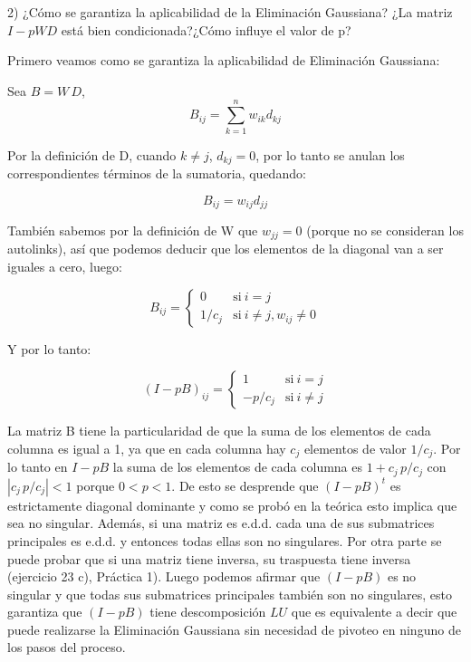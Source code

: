 2) ¿Cómo se garantiza la aplicabilidad de la Eliminación Gaussiana? ¿La matriz $I-pWD$ está bien condicionada?¿Cómo influye el valor de p?

Primero veamos como se garantiza la aplicabilidad de Eliminación Gaussiana:

Sea $B=W\,D$,
\begin{displaymath}
B_{ij}=\sum_{k=1}^n w_{ik}d_{kj}
\end{displaymath}

Por la definición de D, cuando $k\not=j$, $d_{kj}=0$, por lo tanto se anulan los correspondientes términos de la sumatoria, quedando:

\begin{displaymath}
B_{ij}=w_{ij}d_{jj}
\end{displaymath}

También sabemos por la definición de W que $w_{jj}=0$ (porque no se consideran los autolinks), así que podemos deducir que los elementos de la diagonal van a ser iguales a cero, luego:

\begin{equation}
 B_{ij} = \left\{
    \begin{array}{ll}
	 0 & \mathrm{si\ } i=j \\
	 1/c_j & \mathrm{si\ } i\not=j,  w_{ij}\not=0
	 \end{array}
   \right.
\end{equation}

Y por lo tanto:

\begin{equation}
(I-p B)_{ij} = \left\{
    \begin{array}{ll}
	 1 & \mathrm{si\ } i=j \\
	 -p/c_j & \mathrm{si\ } i\not=j
	 \end{array}
   \right.
\end{equation}

La matriz B tiene la particularidad de que la suma de los elementos de cada columna es igual a 1, ya que en cada columna hay $c_j$ elementos de valor $1/c_j$. Por lo tanto en $I-p B$ la suma de los elementos de cada columna es $1+c_j\, p/c_j$ con $|c_j\, p/c_j|<1$ porque $0<p<1$. De esto se desprende que $(I-p B)^t$ es estrictamente diagonal dominante y como se probó en la teórica esto implica que sea no singular. Además, si una matriz es e.d.d. cada una de sus submatrices principales es e.d.d. y entonces todas ellas son no singulares. Por otra parte se puede probar que si una matriz tiene inversa, su traspuesta tiene inversa (ejercicio 23 c), Práctica 1). Luego podemos afirmar que $(I-p B)$ es no singular y que todas sus submatrices principales también son no singulares, esto garantiza que $(I-p B)$ tiene descomposición $LU$ que es equivalente a decir que puede realizarse la Eliminación Gaussiana sin necesidad de pivoteo en ninguno de los pasos del proceso.

